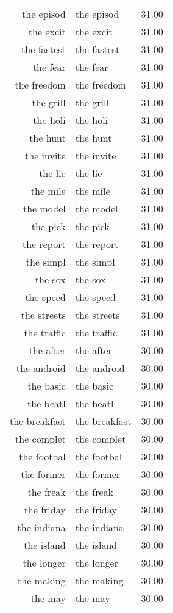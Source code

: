 \begin{table}[ht]
\begin{tabular}{rlr}
  the episod & the episod & 31.00 \\ 
  the excit & the excit & 31.00 \\ 
  the fastest & the fastest & 31.00 \\ 
  the fear & the fear & 31.00 \\ 
  the freedom & the freedom & 31.00 \\ 
  the grill & the grill & 31.00 \\ 
  the holi & the holi & 31.00 \\ 
  the hunt & the hunt & 31.00 \\ 
  the invite & the invite & 31.00 \\ 
  the lie & the lie & 31.00 \\ 
  the mile & the mile & 31.00 \\ 
  the model & the model & 31.00 \\ 
  the pick & the pick & 31.00 \\ 
  the report & the report & 31.00 \\ 
  the simpl & the simpl & 31.00 \\ 
  the sox & the sox & 31.00 \\ 
  the speed & the speed & 31.00 \\ 
  the streets & the streets & 31.00 \\ 
  the traffic & the traffic & 31.00 \\ 
  the after & the after & 30.00 \\ 
  the android & the android & 30.00 \\ 
  the basic & the basic & 30.00 \\ 
  the beatl & the beatl & 30.00 \\ 
  the breakfast & the breakfast & 30.00 \\ 
  the complet & the complet & 30.00 \\ 
  the footbal & the footbal & 30.00 \\ 
  the former & the former & 30.00 \\ 
  the freak & the freak & 30.00 \\ 
  the friday & the friday & 30.00 \\ 
  the indiana & the indiana & 30.00 \\ 
  the island & the island & 30.00 \\ 
  the longer & the longer & 30.00 \\ 
  the making & the making & 30.00 \\ 
  the may & the may & 30.00 \\ 

\end{tabular}
\end{table}
